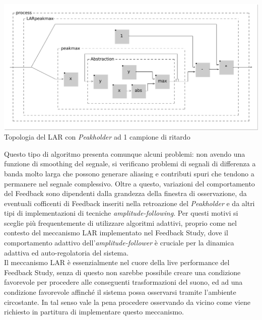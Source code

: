 \begin{center}
    \includegraphics[width=14cm]{figures/LARpeakmax.pdf} \\
    {Topologia del LAR con \textit{Peakholder} ad 1 campione di ritardo} \\ 
\end{center}
\vspace{0.5cm}

Questo tipo di algoritmo presenta comunque alcuni problemi: non avendo
una funzione di smoothing del segnale, si verificano problemi di segnali di differenza a banda
molto larga che possono generare aliasing e contributi spuri che tendono a permanere nel
segnale complessivo.
Oltre a questo, variazioni del comportamento del Feedback sono dipendenti dalla grandezza
della finestra di osservazione, da eventuali cofficenti di Feedback inseriti nella
retroazione del \textit{Peakholder} e da altri tipi di implementazioni di tecniche 
\textit{amplitude-following}. Per questi motivi si sceglie più frequentemente di utilizzare algoritmi
adattivi, proprio come nel contesto del meccanismo LAR implementato nel Feedback Study,
dove il comportamento adattivo dell'\textit{amplitude-follower} è cruciale
per la dinamica adattiva ed auto-regolatoria del sistema.\\
Il meccanismo LAR è essenzialmente nel cuore della live performance del Feedback Study,
senza di questo non sarebbe possibile creare una condizione favorevole per procedere alle 
conseguenti trasformazioni del suono, ed ad una condizione favorevole affinché il 
sistema possa osservarsi tramite l'ambiente circostante. 
In tal senso vale la pena procedere osservando da vicino come viene richiesto in partitura 
di implementare questo meccanismo.

